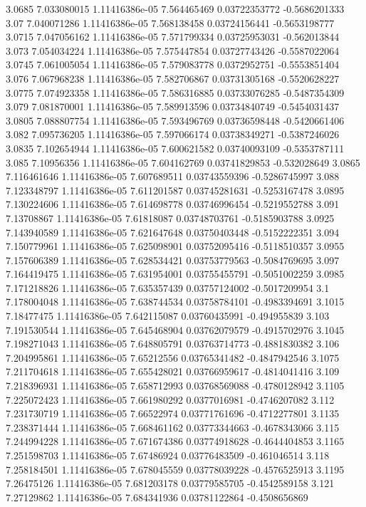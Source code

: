 {3.0685 7.033080015 1.11416386e-05 7.564465469 0.03722353772 -0.5686201333
3.07 7.040071286 1.11416386e-05 7.568138458 0.03724156441 -0.5653198777
3.0715 7.047056162 1.11416386e-05 7.571799334 0.03725953031 -0.562013844
3.073 7.054034224 1.11416386e-05 7.575447854 0.03727743426 -0.5587022064
3.0745 7.061005054 1.11416386e-05 7.579083778 0.0372952751 -0.5553851404
3.076 7.067968238 1.11416386e-05 7.582706867 0.03731305168 -0.5520628227
3.0775 7.074923358 1.11416386e-05 7.586316885 0.03733076285 -0.5487354309
3.079 7.081870001 1.11416386e-05 7.589913596 0.03734840749 -0.5454031437
3.0805 7.088807754 1.11416386e-05 7.593496769 0.03736598448 -0.5420661406
3.082 7.095736205 1.11416386e-05 7.597066174 0.03738349271 -0.5387246026
3.0835 7.102654944 1.11416386e-05 7.600621582 0.03740093109 -0.5353787111
3.085 7.10956356 1.11416386e-05 7.604162769 0.03741829853 -0.532028649
3.0865 7.116461646 1.11416386e-05 7.607689511 0.03743559396 -0.5286745997
3.088 7.123348797 1.11416386e-05 7.611201587 0.03745281631 -0.5253167478
3.0895 7.130224606 1.11416386e-05 7.614698778 0.03746996454 -0.5219552788
3.091 7.13708867 1.11416386e-05 7.61818087 0.03748703761 -0.5185903788
3.0925 7.143940589 1.11416386e-05 7.621647648 0.03750403448 -0.5152222351
3.094 7.150779961 1.11416386e-05 7.625098901 0.03752095416 -0.5118510357
3.0955 7.157606389 1.11416386e-05 7.628534421 0.03753779563 -0.5084769695
3.097 7.164419475 1.11416386e-05 7.631954001 0.03755455791 -0.5051002259
3.0985 7.171218826 1.11416386e-05 7.635357439 0.03757124002 -0.5017209954
3.1 7.178004048 1.11416386e-05 7.638744534 0.03758784101 -0.4983394691
3.1015 7.18477475 1.11416386e-05 7.642115087 0.03760435991 -0.494955839
3.103 7.191530544 1.11416386e-05 7.645468904 0.03762079579 -0.4915702976
3.1045 7.198271043 1.11416386e-05 7.648805791 0.03763714773 -0.4881830382
3.106 7.204995861 1.11416386e-05 7.65212556 0.03765341482 -0.4847942546
3.1075 7.211704618 1.11416386e-05 7.655428021 0.03766959617 -0.4814041416
3.109 7.218396931 1.11416386e-05 7.658712993 0.03768569088 -0.4780128942
3.1105 7.225072423 1.11416386e-05 7.661980292 0.0377016981 -0.4746207082
3.112 7.231730719 1.11416386e-05 7.66522974 0.03771761696 -0.4712277801
3.1135 7.238371444 1.11416386e-05 7.668461162 0.03773344663 -0.4678343066
3.115 7.244994228 1.11416386e-05 7.671674386 0.03774918628 -0.4644404853
3.1165 7.251598703 1.11416386e-05 7.67486924 0.03776483509 -0.461046514
3.118 7.258184501 1.11416386e-05 7.678045559 0.03778039228 -0.4576525913
3.1195 7.26475126 1.11416386e-05 7.681203178 0.03779585705 -0.4542589158
3.121 7.27129862 1.11416386e-05 7.684341936 0.03781122864 -0.4508656869
}
